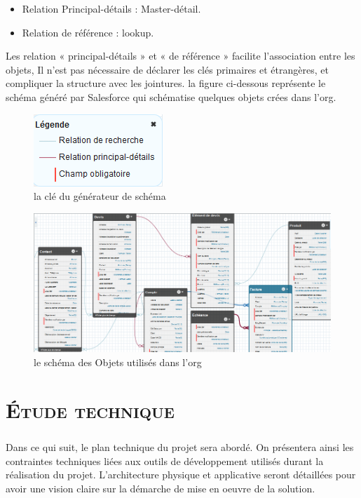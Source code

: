 \documentclass[a4paper, 12pt]{report}
\begin{document}
\begin{itemize}
	\begin{itemize}
		\item Relation Principal-détails : Master-détail.
		\item Relation de référence : lookup.
\end{itemize}
Les relation « principal-détails » et « de référence » facilite l'association entre les objets, Il n'est pas nécessaire de déclarer les clés primaires et étrangères, et compliquer la structure avec les jointures.
la figure ci-dessous représente le schéma généré par Salesforce  qui schématise quelques objets crées dans l'org.
\begin{figure}[H]
\centering
\caption{la clé du générateur de schéma}
\includegraphics[scale=1]{key.png}
\end{figure}
\begin{figure}[H]
\centering
\caption{le schéma des Objets utilisés dans l'org}
\includegraphics[scale=0.6]{schemabuilder.png}
\end{figure}


 

\chapter{\textsc{Étude technique}}

\paragraph{}
Dans ce qui suit, le plan technique du projet sera abordé. On présentera ainsi les contraintes techniques liées aux outils de développement utilisés durant la réalisation du projet. L'architecture physique et applicative seront détaillées pour avoir une vision claire sur la démarche de mise en oeuvre de la solution. 



\end{itemize}
\end{document}
